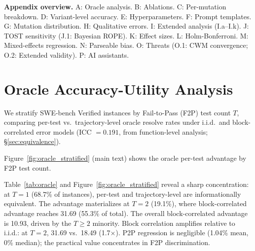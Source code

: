 \appendix

\noindent\textbf{Appendix overview.} A: Oracle analysis. B: Ablations. C: Per-mutation breakdown. D: Variant-level accuracy. E: Hyperparameters. F: Prompt templates. G: Mutation distribution. H: Qualitative errors. I: Extended analysis (I.a--I.k). J: TOST sensitivity (J.1: Bayesian ROPE). K: Effect sizes. L: Holm-Bonferroni. M: Mixed-effects regression. N: Parseable bias. O: Threats (O.1: CWM convergence; O.2: Extended validity). P: AI assistants.

\section{Oracle Accuracy-Utility Analysis}
\label{app:oracle}

We stratify SWE-bench Verified instances by Fail-to-Pass (F2P) test count $T$, comparing per-test vs.\ trajectory-level oracle resolve rates under i.i.d.\ and block-correlated error models (ICC $= 0.191$, from function-level analysis; \S\ref{sec:equivalence}).

\begin{table}[h]
\centering
\small
\caption{Oracle accuracy-utility frontier: per-test advantage stratified by F2P test count ($T$) on SWE-bench Verified (500 instances). Block-correlated model uses function-level ICC $= 0.191$ (from function-level analysis, \S\ref{sec:equivalence}). Pass-to-Pass (P2P) regression rate: 1.04\% mean, 0\% median.}
\label{tab:oracle}
\end{table}

Figure~\ref{fig:oracle_stratified} (main text) shows the oracle per-test advantage by F2P test count.

Table~\ref{tab:oracle} and Figure~\ref{fig:oracle_stratified} reveal a sharp concentration: at $T = 1$ (68.7\% of instances), per-test and trajectory-level are informationally equivalent. The advantage materializes at $T = 2$ (19.1\%), where block-correlated advantage reaches 31.69\pp{} (55.3\% of total). The overall block-correlated advantage is 10.93\pp{}, driven by the $T \geq 2$ minority. Block correlation amplifies relative to i.i.d.: at $T = 2$, 31.69\pp{} vs.\ 18.49\pp{} (1.7$\times$). P2P regression is negligible (1.04\% mean, 0\% median); the practical value concentrates in F2P discrimination.


